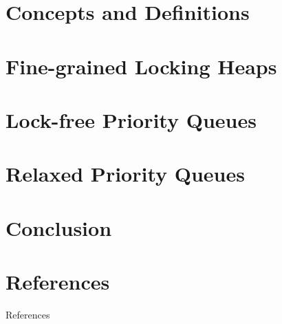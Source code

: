 \documentclass{beamer}
\begin{document}
\section{Concepts and Definitions}

\section{Fine-grained Locking Heaps}

\section{Lock-free Priority Queues}

\section{Relaxed Priority Queues}

\section{Conclusion}

\section{References}

\begin{frame}[allowframebreaks]{References}
\printbibliography
\end{frame}
\end{document}
